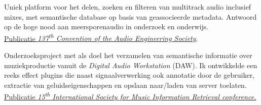 \documentclass[a4paper]{deedy-resume} %
\begin{document}
\begin{minipage}[t]{0.65\textwidth}
\sectionspace %



\hspace{-0.1cm}

Uniek platform voor het delen, zoeken en filteren van multitrack audio inclusief mixes, met semantische database op basis van geassocieerde metadata. Antwoord op de hoge nood aan meersporenaudio in onderzoek en onderwijs.\\
\href{http://www.brechtdeman.com/publications/aes137.pdf}{Publicatie \emph{137\textsuperscript{th} Convention of the Audio Engineering Society}}. 

\sectionspace %


\hspace{-0.1cm}
Onderzoeksproject met als doel het verzamelen van semantische informatie over muziekproductie vanuit de \emph{Digital Audio Workstation} (DAW). Ik ontwikkelde een reeks effect plugins die naast signaalverwerking ook annotatie door de gebruiker, extractie van geluidseigenschappen en opslaan naar/laden van server toelaten.\\
\href{http://www.terasoft.com.tw/conf/ismir2014/LBD/LBD15.pdf}{Publicatie \emph{15\textsuperscript{th} International Society for Music Information Retrieval conference.}}

\sectionspace %


\end{minipage}
\end{document}
